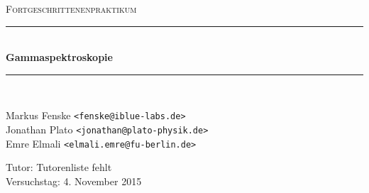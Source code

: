 \newcommand{\HRule}{\rule{\linewidth}{0.5mm}}

\begin{center}
  \textsc{\Large Fortgeschrittenenpraktikum}
  \HRule\\[0.4 cm]
  {\huge \bfseries Gammaspektroskopie}
  \HRule\\[0.4 cm]

  \begin{minipage}{0.60\textwidth}
  \begin{flushleft}
    Markus Fenske \texttt{<fenske@iblue-labs.de>} \\
    Jonathan Plato \texttt{<jonathan@plato-physik.de>} \\
    Emre Elmali \texttt{<elmali.emre@fu-berlin.de>}
  \end{flushleft}
  \end{minipage}
  \hfill
  \begin{minipage}{0.35\textwidth}
  \begin{flushright}
    Tutor: Tutorenliste fehlt \\
    Versuchstag: 4. November 2015
  \end{flushright}
  \end{minipage}

  \vspace{1cm}

  \tableofcontents


  \vfill
\end{center}
\newpage
